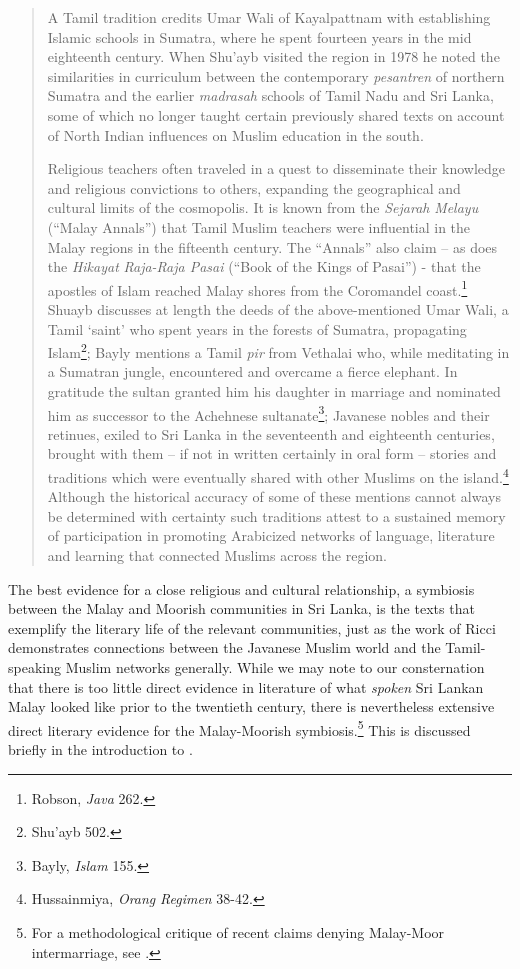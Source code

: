 \begin{quote}
A Tamil tradition credits Umar Wali of Kayalpattnam with establishing Islamic schools in Sumatra, where he spent fourteen years in the mid eighteenth century. When Shu'ayb visited the region in 1978 he noted the similarities in curriculum between the contemporary \textit{pesantren} of northern Sumatra and the earlier \textit{madrasah} schools of Tamil Nadu and Sri Lanka, some of which no longer taught certain previously shared texts on account of North Indian influences on Muslim education in the south.

Religious teachers often traveled in a quest to disseminate their knowledge and religious convictions to others, expanding the geographical and cultural limits of the cosmopolis. It is known from the \textit{Sejarah} \textit{Melayu} ({\textquotedblleft}Malay Annals{\textquotedblright}) that Tamil Muslim teachers were influential in the Malay regions in the fifteenth century. The {\textquotedblleft}Annals{\textquotedblright} also claim -- as does the \textit{Hikayat} \textit{Raja-Raja Pasai} ({\textquotedblleft}Book of the Kings of Pasai{\textquotedblright}) -  that the apostles of Islam reached  Malay shores from the Coromandel coast.\footnote{Robson, \textit{Java} 262.} Shuayb discusses at length the deeds of the above-mentioned Umar Wali, a Tamil `saint' who spent years in the forests of Sumatra, propagating Islam\footnote{Shu'ayb 502.}; Bayly mentions a Tamil \textit{pir} from Vethalai who, while meditating in a Sumatran jungle, encountered and overcame a fierce elephant. In gratitude the  sultan granted him his daughter in marriage and nominated him as successor to the Achehnese sultanate\footnote{Bayly, \textit{Islam} 155.}; Javanese nobles and their retinues, exiled to Sri Lanka in the seventeenth and eighteenth centuries, brought with them -- if not in written certainly in oral form -- stories and traditions which were eventually shared with other Muslims on the island.\footnote{Hussainmiya, \textit{Orang} \textit{Regimen }38-42.} Although the historical accuracy of some of these mentions cannot always be determined with certainty such traditions attest to a sustained memory of participation in promoting Arabicized networks of language, literature and learning that connected Muslims across the region. \citep[388-389]{Ricci2006}
\end{quote}

The best evidence for a close religious and cultural relationship, a symbiosis between the Malay and Moorish communities in Sri Lanka, is the texts that exemplify the literary life of the relevant communities, just as the work of Ricci demonstrates connections between the Javanese Muslim world and the Tamil-speaking Muslim networks generally. While we may note to our consternation that there is too little direct evidence in literature of what \textit{spoken} Sri Lankan Malay looked like prior to the twentieth century, there is nevertheless extensive direct literary evidence for the Malay-Moorish symbiosis.\footnote{For a methodological critique of recent claims denying Malay-Moor intermarriage, see \citet{Rassooltv}.} This is discussed briefly in the introduction to \citet{Hussainmiya2008}.

